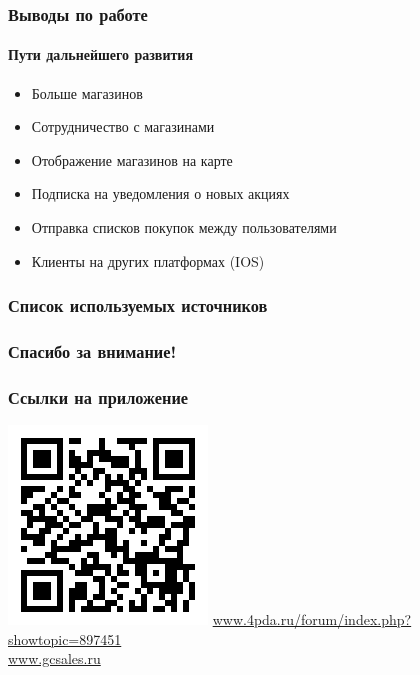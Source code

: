 \documentclass{beamer}
\begin{document}
\begin{frame}
    \frametitle{Выводы по работе}
    \framesubtitle{Пути дальнейшего развития}
    \begin{itemize}
        \item Больше магазинов
        \item Сотрудничество с магазинами
        \item Отображение магазинов на карте
        \item Подписка на уведомления о новых акциях
        \item Отправка списков покупок между пользователями
        \item Клиенты на других платформах (IOS)
    \end{itemize}
\end{frame}

\begin{frame}
    \frametitle{Список используемых источников}
    \nocite{*}
    \printbibliography{}
\end{frame}

\begin{frame}[c]
\begin{center}
\frametitle{\LARGE Спасибо за внимание!}

{\LARGE \inserttitle}

\bigskip

{\insertauthor}

\bigskip\bigskip

{\insertinstitute}

\bigskip\bigskip

{\large \insertdate}
\end{center}
\end{frame}

\begin{frame}[c]
\begin{center}
\frametitle{\LARGE Ссылки на приложение}

    \includegraphics[width=0.4\columnwidth]{4pdaQR.png}
    \url{www.4pda.ru/forum/index.php?showtopic=897451}
    \bigskip\\
    \smallskip
    \url{www.gcsales.ru}

\end{center}
\end{frame}
\end{document}
